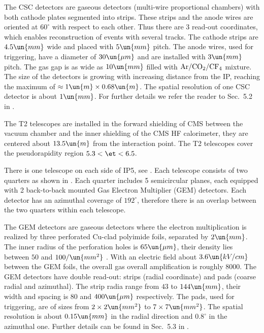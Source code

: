 The CSC detectors are gaseous detectors (multi-wire proportional chambers) with both cathode plates segmented into strips. These strips and the anode wires are oriented at $60^\circ$ with respect to each other. Thus there are 3 read-out coordinates, which enables reconstruction of events with several 
tracks. The cathode strips are $4.5\un{mm}$ wide and placed with $5\un{mm}$ pitch. The anode wires, used for triggering, have a diameter of $30\un{\mu m}$ and are installed with $3\un{mm}$ pitch. The gas gap is as wide as $10\un{mm}$ filled with $\rm Ar/CO_2/CF_4$ mixture. The size of the detectors is growing with increasing distance from the IP, reaching the maximum of $\approx 1\un{m} \times 0.68\un{m}$. The spatial resolution of one CSC detector is about $1\un{mm}$. For further details we refer the reader to Sec.~5.2 in .




The T2 telescopes are installed in the forward shielding of CMS between the vacuum chamber and the inner shielding of the CMS HF calorimeter, they are centered about $13.5\un{m}$ from the interaction point. The T2 telescopes cover the pseudorapidity region $5.3 < \et < 6.5$.

There is one telescope on each side of IP5, see . Each telescope consists of two quarters as shown in . Each quarter includes 5 semicircular planes, each equipped with 2 back-to-back mounted Gas Electron Multiplier (GEM) detectors. Each detector has an azimuthal coverage of $192^\circ$, therefore there is an overlap between the two quarters within each telescope.

The GEM detectors are gaseous detectors where the electron multiplication is realized by three perforated Cu-clad polyimide foils, separated by $2\un{mm}$. The inner radius of the perforation holes is $65\un{\mu m}$, their density lies between $50$ and $100/\un{mm^2}$ . With an electric field about $3.6 \un{kV/cm}$ between the GEM foils, the overall gas overall amplification is roughly $8000$. The GEM detectors have double read-out: strips (radial coordinate) and pads (coarse radial and azimuthal). The strip radia range from $43$ to $144\un{mm}$, their width and spacing is $80$ and $400\un{\mu m}$ respectively. The pads, used for triggering, are of sizes from $2\times 2\un{mm^2}$ to $7\times 7\un{mm^2}$. The spatial resolution is about $0.15\un{mm}$ in the radial direction and $0.8^\circ$ in the azimuthal one. Further details can be found in Sec.~5.3 in .

